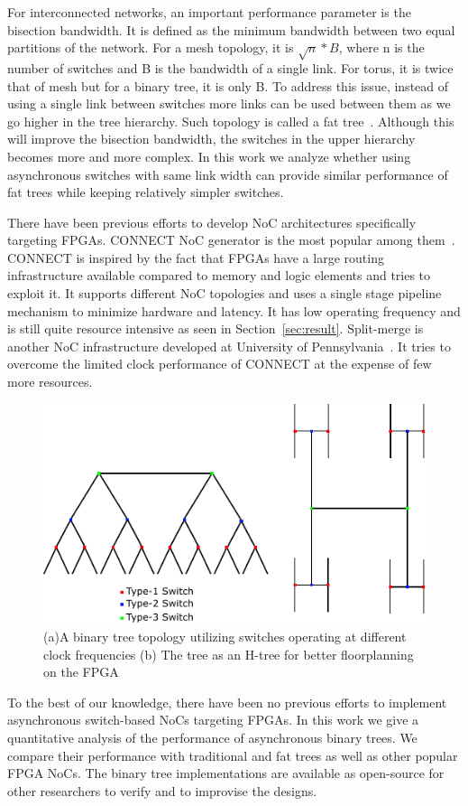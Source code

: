 For interconnected networks, an important performance parameter is the bisection bandwidth.
It is defined as the minimum bandwidth between two equal partitions of the network.
For a mesh topology, it is $\sqrt{n}*B$, where n is the number of switches and B is the bandwidth of a single link.
For torus, it is twice that of mesh but for a binary tree, it is only B.
To address this issue, instead of using a single link between switches more links can be used between them as we go higher in the tree hierarchy.
Such topology is called a fat tree~\cite{Leiserson1985}. 
Although this will improve the bisection bandwidth, the switches in the upper hierarchy becomes more and more complex.
In this work we analyze whether using asynchronous switches with same link width can provide similar performance of fat trees while keeping relatively simpler switches.

There have been previous efforts to develop NoC architectures specifically targeting FPGAs.
CONNECT NoC generator is the most popular among them~\cite{papa_connect_fpga2012}.
CONNECT is inspired by the fact that FPGAs have a large routing infrastructure available compared to memory and logic elements and tries to exploit it. 
It supports different NoC topologies and uses a single stage pipeline mechanism  to minimize hardware and latency. 
It has low operating frequency and is still quite resource intensive as seen in Section~\ref{sec:result}. 
Split-merge is another NoC infrastructure developed at University of Pennsylvania~\cite{Huan2012}.
It tries to overcome the limited clock performance of CONNECT at the expense of few more resources.

\begin{figure}[t]
\centering
   \includegraphics[width=\columnwidth]{Figures/HNoC.pdf}
   \caption{(a)A binary tree topology utilizing switches operating at different clock frequencies (b) The tree as an H-tree for better floorplanning on the FPGA}
   \label{fig:btree}
\end{figure}


To the best of our knowledge, there have been no previous efforts to implement asynchronous switch-based NoCs targeting FPGAs. 
In this work we give a quantitative analysis of the performance of asynchronous binary trees.
We compare their performance with traditional and fat trees as well as other popular FPGA NoCs.
The binary tree implementations are available as open-source for other researchers to verify and to improvise the designs.